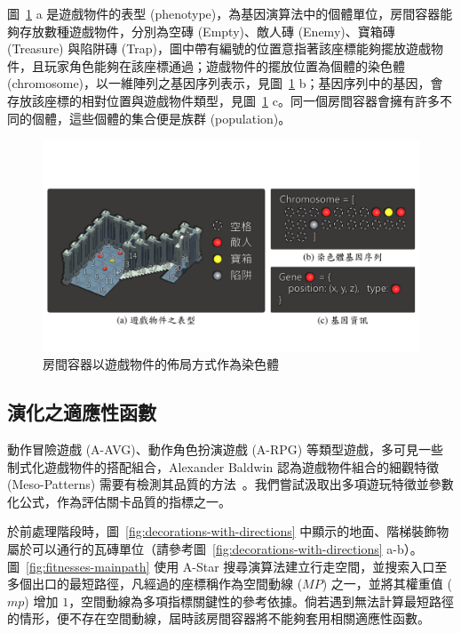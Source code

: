 圖~\ref{fig:segments-gene-expression} a 是遊戲物件的表型 (phenotype)，為基因演算法中的個體單位，房間容器能夠存放數種遊戲物件，分別為空磚 (Empty)、敵人磚 (Enemy)、寶箱磚 (Treasure) 與陷阱磚 (Trap)，圖中帶有編號的位置意指著該座標能夠擺放遊戲物件，且玩家角色能夠在該座標通過；遊戲物件的擺放位置為個體的染色體 (chromosome)，以一維陣列之基因序列表示，見圖~\ref{fig:segments-gene-expression} b；基因序列中的基因，會存放該座標的相對位置與遊戲物件類型，見圖~\ref{fig:segments-gene-expression} c。同一個房間容器會擁有許多不同的個體，這些個體的集合便是族群 (population)。

\begin{figure}[!htb]
  \begin{center}
    \includegraphics[width=1.0\textwidth]{figures/segments-gene-expression.pdf}
    \caption{房間容器以遊戲物件的佈局方式作為染色體}
    \label{fig:segments-gene-expression}
  \end{center}
\end{figure}

\subsection{演化之適應性函數}
\label{ssec:method-segments-fitnesses}

動作冒險遊戲 (A-AVG)、動作角色扮演遊戲 (A-RPG) 等類型遊戲，多可見一些制式化遊戲物件的搭配組合，Alexander Baldwin 認為遊戲物件組合的細觀特徵 (Meso-Patterns) 需要有檢測其品質的方法~\cite{baldwin2017mixed}。我們嘗試汲取出多項遊玩特徵並參數化公式，作為評估關卡品質的指標之一。

於前處理階段時，圖~\ref{fig:decorations-with-directions} 中顯示的地面、階梯裝飾物屬於可以通行的瓦磚單位（請參考圖~\ref{fig:decorations-with-directions} a-b）。圖~\ref{fig:fitnesses-mainpath} 使用 A-Star 搜尋演算法建立行走空間，並搜索入口至多個出口的最短路徑，凡經過的座標稱作為空間動線 ($MP$) 之一，並將其權重值 ($mp$) 增加 $1$，空間動線為多項指標關鍵性的參考依據。倘若遇到無法計算最短路徑的情形，便不存在空間動線，屆時該房間容器將不能夠套用相關適應性函數。

